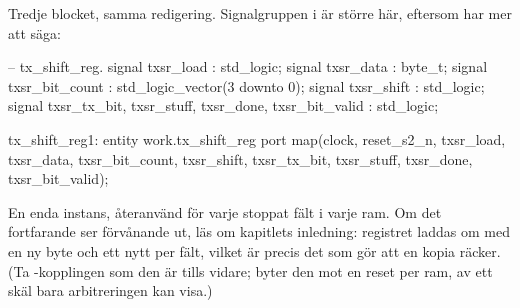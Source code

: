 Tredje blocket, samma redigering. Signalgruppen i  är större här,
eftersom  har mer att säga:

\begin{vhdlcode}
    -- tx_shift_reg.
    signal txsr_load                                          : std_logic;
    signal txsr_data                                          : byte_t;
    signal txsr_bit_count                                     : std_logic_vector(3 downto 0);
    signal txsr_shift                                         : std_logic;
    signal txsr_tx_bit, txsr_stuff, txsr_done, txsr_bit_valid : std_logic;
\end{vhdlcode}

\begin{vhdlcode}
    tx_shift_reg1: entity work.tx_shift_reg
        port map(clock, reset_s2_n, txsr_load, txsr_data, txsr_bit_count, txsr_shift,
                 txsr_tx_bit, txsr_stuff, txsr_done, txsr_bit_valid);
\end{vhdlcode}

En enda instans, återanvänd för varje stoppat fält i varje ram. Om det fortfarande ser förvånande ut,
läs om kapitlets inledning: registret laddas om med en ny byte och ett nytt  per
fält, vilket är precis det som gör att en kopia räcker. (Ta -kopplingen som den är
tills vidare;  byter den mot en reset per ram, av ett skäl bara arbitreringen kan
visa.)
